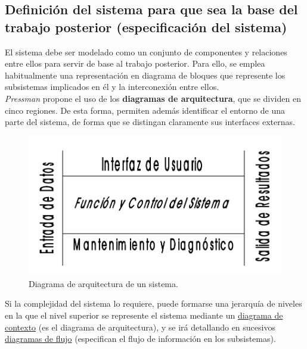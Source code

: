 \subsection{Definición del sistema para que sea la base del trabajo posterior (especificación del sistema)}

El sistema debe ser modelado como un conjunto de componentes y relaciones entre ellos para servir de base al trabajo posterior. Para ello, se emplea habitualmente una representación en diagrama de bloques que represente los subsistemas implicados en él y la interconexión entre ellos.\\

\textit{Pressman} propone el uso de los \textbf{diagramas de arquitectura}, que se dividen en cinco regiones. De esta forma, permiten además identificar el entorno de una parte del sistema, de forma que se distingan claramente sus interfaces externas.\\

\begin{figure}[H]
    \centering
    \includegraphics[width=0.6\linewidth]{Resources/Tema4/diagramaArquitectura.png}
    \caption{Diagrama de arquitectura de un sistema.}
\end{figure}

Si la complejidad del sistema lo requiere, puede formarse una jerarquía de niveles en la que el nivel superior se represente el sistema mediante un \uline{diagrama de contexto} (es el diagrama de arquitectura), y se irá detallando en sucesivos \uline{diagramas de flujo} (especifican el flujo de información en los subsistemas).

